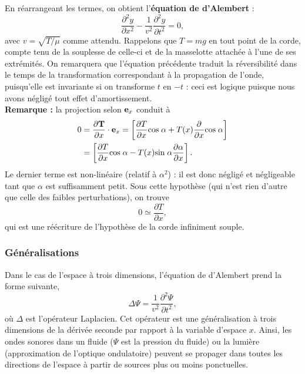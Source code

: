 \documentclass[11pt,a4paper]{report}
\begin{document}
En réarrangeant les termes, on obtient l'\textbf{équation de d'Alembert} :
\begin{equation}
	\frac{\partial^2 y}{\partial x^2} - \frac{1}{v^2}\frac{\partial^2 y}{\partial t^2} = 0,
\end{equation}
avec $v = \sqrt{T/\mu}$ comme attendu. Rappelons que $T = mg$ en tout point de la corde, compte tenu de la souplesse de celle-ci et de la masselotte attachée à l'une de ses extrémités. On remarquera que l'équation précédente traduit la réversibilité dans le temps de la transformation correspondant à la propagation de l'onde, puisqu'elle est invariante si on transforme $t$ en $-t$ : ceci est logique puisque nous avons négligé tout effet d'amortissement.\\

\textbf{Remarque :} la projection selon $\bold{e}_x$ conduit à
\begin{align*}
	0 & = \frac{\partial \bold{T}}{\partial x}\cdot\bold{e}_x = \left[\frac{\partial T}{\partial x} \text{cos}\;\alpha + T(x)\frac{\partial}{\partial x} \text{cos}\;\alpha \right]\\
	& = \left[\frac{\partial T}{\partial x} \text{cos}\;\alpha - T(x)\text{sin}\;\alpha \frac{\partial \alpha}{\partial x}\right].
\end{align*}
Le dernier terme est non-linéaire (relatif à $\alpha^2$) : il est donc négligé et négligeable tant que $\alpha$ est suffisamment petit. Sous cette hypothèse (qui n'est rien d'autre que celle des faibles perturbations), on trouve
\begin{equation}
	0 \simeq \frac{\partial T}{\partial x},
\end{equation}
qui est une réécriture de l'hypothèse de la corde infiniment souple.

\subsubsection{Généralisations}

Dans le cas de l'espace à trois dimensions, l'équation de d'Alembert prend la forme suivante,
\begin{equation}
	\Delta \Psi = \frac{1}{v^2} \frac{\partial^2\Psi}{\partial t^2},
\end{equation}
où $\Delta$ est l'opérateur Laplacien. Cet opérateur est une généralisation à trois dimensions de la dérivée seconde par rapport à la variable d'espace $x$. Ainsi, les ondes sonores dans un fluide ($\Psi$ est la pression du fluide) ou la lumière (approximation de l'optique ondulatoire) peuvent se propager dans toutes les directions de l'espace à partir de sources plus ou moins ponctuelles.\\
\end{document}
